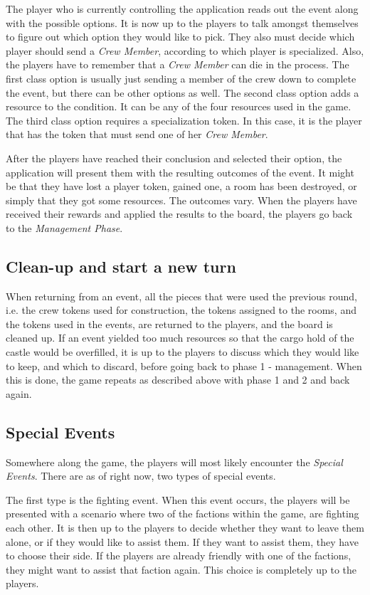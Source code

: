 The player who is currently controlling the application reads out the event along with the possible options. It is now up to the players to talk amongst themselves to figure out which option they would like to pick. They also must decide which player should send a \textit{Crew Member}, according to which player is specialized. Also, the players have to remember that a \textit{Crew Member} can die in the process. The first class option is usually just sending a member of the crew down to complete the event, but there can be other options as well. The second class option adds a resource to the condition. It can be any of the four resources used in the game. The third class option requires a specialization token. In this case, it is the player that has the token that must send one of her \textit{Crew Member}. 

After the players have reached their conclusion and selected their option, the application will present them with the resulting outcomes of the event. It might be that they have lost a player token, gained one, a room has been destroyed, or simply that they got some resources. The outcomes vary. When the players have received their rewards and applied the results to the board, the players go back to the \textit{Management Phase}.

\subsection{Clean-up and start a new turn}
When returning from an event, all the pieces that were used the previous round, i.e. the crew tokens used for construction, the tokens assigned to the rooms, and the tokens used in the events, are returned to the players, and the board is cleaned up.
If an event yielded too much resources so that the cargo hold of the castle would be overfilled, it is up to the players to discuss which they would like to keep, and which to discard, before going back to phase 1 - management.
When this is done, the game repeats as described above with phase 1 and 2 and back again.

\subsection{Special Events}

Somewhere along the game, the players will most likely encounter the \textit{Special Events}. There are as of right now, two types of special events.

The first type is the fighting event. When this event occurs, the players will be presented with a scenario where two of the factions within the game, are fighting each other. It is then up to the players to decide whether they want to leave them alone, or if they would like to assist them. If they want to assist them, they have to choose their side. If the players are already friendly with one of the factions, they might want to assist that faction again. This choice is completely up to the players.

